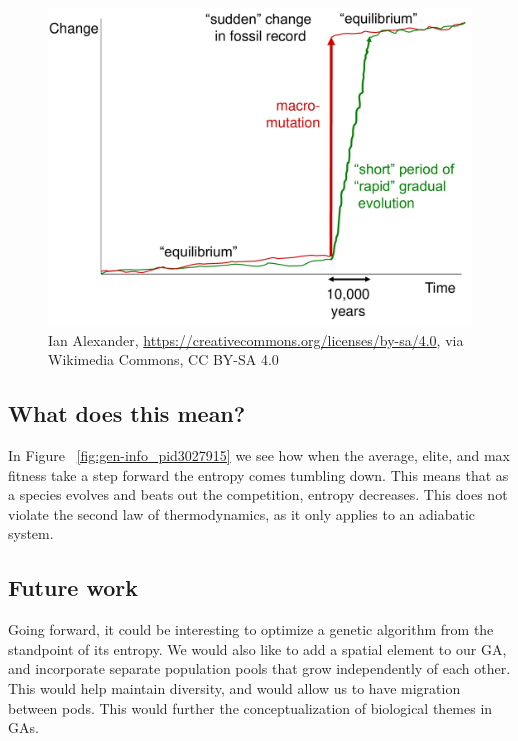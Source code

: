 \documentclass[11pt]{article}
\begin{document}
\begin{figure}[t]
	\begin{center}
	\includegraphics[scale=0.25]{Punctuated_Equilibrium.pdf}
	\caption{\small Ian Alexander,
          \url{https://creativecommons.org/licenses/by-sa/4.0}, via
          Wikimedia Commons, CC BY-SA 4.0}
      \label{fig:punctuated-equilibrium}
\end{center}
\end{figure}

\subsection{What does this mean?}
\label{sec😮rgf7b36ed}

In Figure ~\ref{fig:gen-info_pid3027915} we see how when the average, elite, and max fitness take a
step forward the entropy comes tumbling down. This means that as a
species evolves and beats out
the competition, entropy decreases. This does not violate the second
law of thermodynamics, as it only applies to an adiabatic
system.

\subsection{Future work}
\label{sec:org0f04af1}

Going forward, it could be interesting to optimize a genetic algorithm
from the standpoint of its entropy. We would also like to add a spatial 
element to our GA, and incorporate separate population pools that grow 
independently of each other. This would help maintain diversity, and 
would allow us to have migration between pods. This would further 
the conceptualization of biological themes in GAs.
\end{document}
